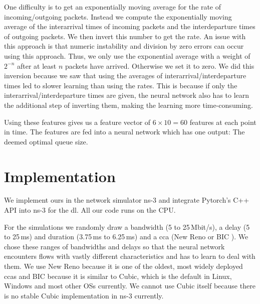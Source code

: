 \documentclass[conference]{IEEEtran}
\begin{document}
One difficulty is to get an exponentially moving average for the rate of incoming/outgoing packets. Instead we compute the exponentially moving average of the interarrival times of incoming packets and the interdeparture times of outgoing packets. We then invert this number to get the rate. An issue with this approach is that numeric instability and division by zero errors can occur using this approach. Thus, we only use the exponential average with a weight of $2^{-n}$ after at least $n$ packets have arrived. Otherwise we set it to zero. We did this inversion because we saw that using the averages of interarrival/interdeparture times led to slower learning than using the rates. This is because if only the interarrival/interdeparture times are given, the neural network also has to learn the additional step of inverting them, making the learning more time-consuming. 

Using these features gives us a feature vector of $6\times 10 = 60$ features at each point in time. The features are fed into a neural network which has one output: The deemed optimal queue size.  

\section{Implementation} 

We implement \gls{ours} in the network simulator ns-3 \cite{nsnam_ns-3_nodate} and integrate Pytorch's \cite{paszke_pytorch_2019} C++ API into ns-3 for the \gls{dl}. All our code runs on the CPU. 

For the simulations we randomly draw a bandwidth (5 to 25\,Mbit/s), a delay (5 to 25\,ms) and duration (3.75\,ms to 6.25\,ms) and a \gls{cca} (New Reno or BIC \cite{lisong_xu_binary_2004}). We chose these ranges of bandwidths and delays so that the neural network encounters flows with vastly different characteristics and has to learn to deal with them. We use New Reno because it is one of the oldest, most widely deployed \glspl{cca} and BIC because it is similar to Cubic, which is the default in Linux, Windows and most other OSs currently. We cannot use Cubic itself because there is no stable Cubic implementation in ns-3 currently. 
\end{document}
